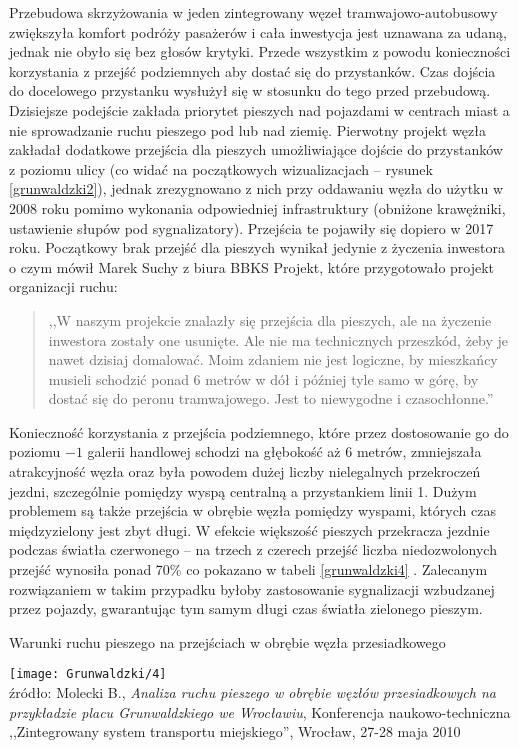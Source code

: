 \documentclass[twoside,12pt]{article}
\begin{document}
	Przebudowa skrzyżowania w jeden zintegrowany węzeł tramwajowo-autobusowy zwiększyła komfort podróży pasażerów i cała inwestycja jest uznawana za udaną, jednak nie obyło się bez głosów krytyki. Przede wszystkim z powodu konieczności korzystania z przejść podziemnych aby dostać się do przystanków. Czas dojścia do docelowego przystanku wysłużył się w stosunku do tego przed przebudową. Dzisiejsze podejście zakłada priorytet pieszych nad pojazdami w centrach miast a nie sprowadzanie ruchu pieszego pod lub nad ziemię. Pierwotny projekt węzła zakładał dodatkowe przejścia dla pieszych umożliwiające dojście do przystanków z poziomu ulicy (co widać na początkowych wizualizacjach -- rysunek \ref{grunwaldzki2}), jednak zrezygnowano z nich przy oddawaniu węzła do użytku w 2008 roku pomimo wykonania odpowiedniej infrastruktury (obniżone krawężniki, ustawienie słupów pod sygnalizatory). Przejścia te pojawiły się dopiero w 2017 roku. Początkowy brak przejść dla pieszych wynikał jedynie z życzenia inwestora o czym mówił Marek Suchy z biura BBKS Projekt, które przygotowało projekt organizacji ruchu:
	\begin{quote}
	,,W naszym projekcie znalazły się przejścia dla pieszych, ale na życzenie inwestora zostały one usunięte. Ale nie ma technicznych przeszkód, żeby je nawet dzisiaj domalować. Moim zdaniem nie jest logiczne, by mieszkańcy musieli schodzić ponad 6 metrów w dół i później tyle samo w górę, by dostać się do peronu tramwajowego. Jest to niewygodne i czasochłonne.”
	\end{quote}
	
	Konieczność korzystania z przejścia podziemnego, które przez dostosowanie go do poziomu $-1$ galerii handlowej schodzi na głębokość aż 6 metrów, zmniejszała atrakcyjność węzła oraz była powodem dużej liczby nielegalnych przekroczeń jezdni, szczególnie pomiędzy wyspą centralną a przystankiem linii 1. Dużym problemem są także przejścia w obrębie węzła pomiędzy wyspami, których czas międzyzielony jest zbyt długi. W efekcie większość pieszych przekracza jezdnie podczas światła czerwonego -- na trzech z czerech przejść liczba niedozwolonych przejść wynosiła ponad 70\% co pokazano w tabeli \ref{grunwaldzki4} \cite{grunwaldzki3}. Zalecanym rozwiązaniem w takim przypadku byłoby zastosowanie sygnalizacji wzbudzanej przez pojazdy, gwarantując tym samym długi czas światła zielonego pieszym. 
	
		\begin{table}[H]
		\centering
		\caption{Warunki ruchu pieszego na przejściach w obrębie węzła przesiadkowego}
		\texttt{[image: Grunwaldzki/4]}\\
		\footnotesize{źródło: Molecki B., \emph{Analiza ruchu pieszego w obrębie węzłów przesiadkowych na przykładzie placu Grunwaldzkiego we Wrocławiu}, Konferencja naukowo-techniczna ,,Zintegrowany system transportu miejskiego'', Wrocław, 27-28 maja 2010 \cite{grunwaldzki4}}
		\label{grunwaldzki4}
	\end{table}	
\end{document}
